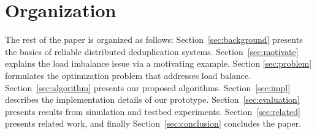 

\section{Organization}
The rest of the paper is organized as follows: 
Section~\ref{sec:background} presents the basics of reliable distributed
deduplication systems. 
Section~\ref{sec:motivate} explains the load imbalance issue
via a motivating example. 
Section \ref{sec:problem} formulates the optimization problem that addresses
load balance. 
Section~\ref{sec:algorithm} presents our proposed algorithms. 
Section~\ref{sec:impl} describes the implementation details of our prototype.
Section~\ref{sec:evaluation} presents results from simulation and testbed
experiments. 
Section~\ref{sec:related} presents related work, and finally
Section~\ref{sec:conclusion} concludes the paper. 
